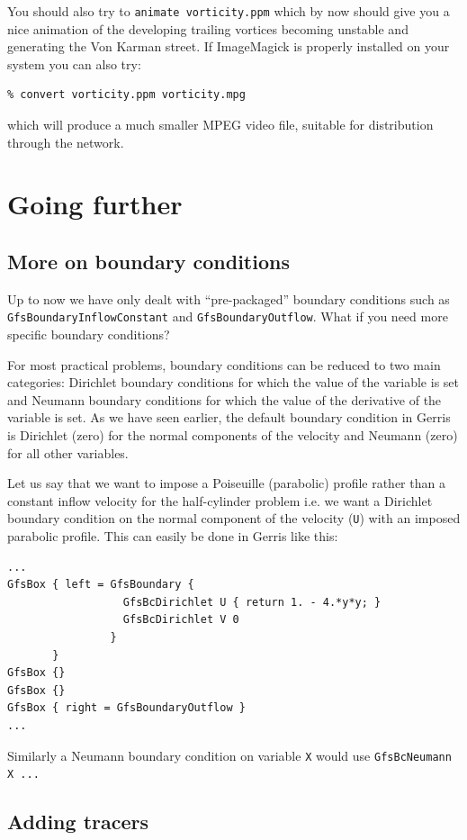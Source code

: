 \documentclass[a4paper]{article}
\begin{document}
You should also try to {\tt animate vorticity.ppm} which by now should 
give you a nice animation of the developing trailing vortices becoming 
unstable and generating the Von Karman street. If ImageMagick is
properly installed on your system you can also try:
\begin{verbatim}
% convert vorticity.ppm vorticity.mpg
\end{verbatim}
which will produce a much smaller {\sc MPEG} video file, suitable for
distribution through the network.

\section{Going further}

\subsection{More on boundary conditions}
\label{morebc}

Up to now we have only dealt with ``pre-packaged'' boundary conditions
such as {\tt GfsBoundaryInflowConstant} and {\tt GfsBoundaryOutflow}.
What if you need more specific boundary conditions?

For most practical problems, boundary conditions can be reduced to two
main categories: Dirichlet boundary conditions for which the value of
the variable is set and Neumann boundary conditions for which the
value of the derivative of the variable is set. As we have seen
earlier, the default boundary condition in Gerris is Dirichlet (zero)
for the normal components of the velocity and Neumann (zero) for all
other variables.

Let us say that we want to impose a Poiseuille (parabolic) profile
rather than a constant inflow velocity for the half-cylinder problem
i.e. we want a Dirichlet boundary condition on the normal component of
the velocity ({\tt U}) with an imposed parabolic profile. This can
easily be done in Gerris like this:
\begin{verbatim}
...
GfsBox { left = GfsBoundary {
                  GfsBcDirichlet U { return 1. - 4.*y*y; }
                  GfsBcDirichlet V 0
                }
       }
GfsBox {}
GfsBox {}
GfsBox { right = GfsBoundaryOutflow }
...
\end{verbatim}
Similarly a Neumann boundary condition on variable {\tt X} would use
{\tt GfsBcNeumann X ...}

\subsection{Adding tracers}
\end{document}

